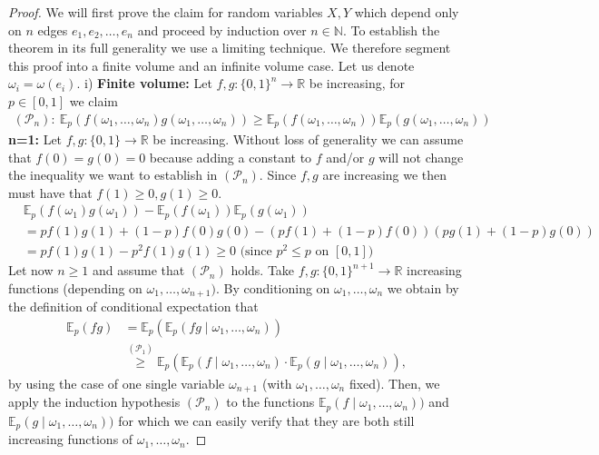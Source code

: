 \documentclass[12pt,a4paper]{article}
\theoremstyle{definition}
\begin{document}
\begin{proof}
We will first prove the claim for random variables $X,Y$ which depend only on $n$ edges $e_1, e_2, \dots , e_n$ and proceed by induction over $n \in \mathbb{N}$. To establish the theorem in its full generality we use a limiting technique. We therefore segment this proof into a finite volume and an infinite volume case. Let us denote $\omega_i = \omega(e_i)$.
\newpage 
i) \textbf{Finite volume:} Let $f,g : \{0,1\}^n \to \mathbb{R}$ be increasing, for $p \in [0,1]$ we claim \begin{align*}
(\mathcal{P}_n) : \ \mathbb{E}_p( f ( \omega_1, \dots , \omega_n) g ( \omega_1, \dots , \omega_n)) \geq \mathbb{E}_p(f( \omega_1, \dots , \omega_n)) \mathbb{E}_p( g ( \omega_1, \dots , \omega_n)) 
\end{align*}
\textbf{n=1:} Let $f,g : \{0,1\} \to \mathbb{R}$ be increasing. Without loss of generality we can assume that $f(0)=g(0)=0$ because adding a constant to $f$ and/or $g$ will not change the inequality we want to establish in $(\mathcal{P}_n)$. Since $f,g$ are increasing we then must have that $f(1) \geq 0, g(1) \geq 0$. 
\begin{align*}
&\mathbb{E}_p(f(\omega_1) g(\omega_1)) - \mathbb{E}_p( f(\omega_1))\mathbb{E}_p(g ( \omega_1))\\  &= p f(1)g(1) + (1-p)f(0)g(0) -(pf(1) + (1-p)f(0))(pg(1)+(1-p)g(0)) \\
&= pf(1)g(1)-p^2f(1)g(1) \geq 0 \text{ (since $p^2 \leq p$ on $[0,1]$})
\end{align*}
Let now $n \geq 1$ and assume that $( \mathcal{P}_n)$ holds. Take $f,g : \{0,1\}^{n+1} \to \mathbb{R}$ increasing functions (depending on $\omega_1, \dots , \omega_{n+1})$. By conditioning on $\omega_1, \dots , \omega_n$ we obtain by the definition of conditional expectation that 
\begin{align*}
\mathbb{E}_p(fg) &= \mathbb{E}_p(\mathbb{E}_p( fg \mid \omega_1, \dots , \omega_n))
\\
& \overset{(\mathcal{P}_1)}\geq \mathbb{E}_p( \mathbb{E}_p(f \mid \omega_1, \dots , \omega_n) \cdot \mathbb{E}_p( g \mid \omega_1,  \dots , \omega_n)),
\end{align*}
by using the case of one single variable $\omega_{n+1}$ (with $\omega_1, \dots , \omega_n$ fixed). Then, we apply the induction hypothesis $(\mathcal{P}_n)$ to the functions $\mathbb{E}_p(f \mid \omega_1, \dots , \omega_n))$ and $\mathbb{E}_p(g \mid \omega_1, \dots , \omega_n))$ for which we can easily verify that they are both still increasing functions of $\omega_1, \dots , \omega_n$. 

\end{proof}
\end{document}
